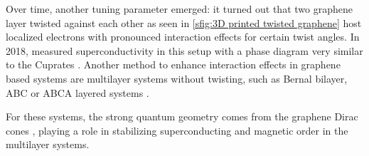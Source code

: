 \documentclass[../main.tex]{subfiles}
\begin{document}
Over time, another tuning parameter emerged: it turned out that two graphene layer twisted against each other as seen in \cref{sfig:3D printed twisted graphene} host localized electrons with pronounced interaction effects for certain twist angles.
In 2018, \citeauthor{caoUnconventionalSuperconductivityMagicangle2018} measured superconductivity in this setup with a phase diagram very similar to the Cuprates \cite{caoUnconventionalSuperconductivityMagicangle2018}.
Another method to enhance interaction effects in graphene based systems are multilayer systems without twisting, such as Bernal bilayer, ABC or ABCA layered systems \cite{pantaleonSuperconductivityCorrelatedPhases2023}.

For these systems, the strong quantum geometry comes from the graphene Dirac cones \cite{wehlingDiracMaterials2014}, playing a role in stabilizing superconducting \cite{peottaSuperfluidityTopologicallyNontrivial2015, liangBandGeometryBerry2017, tanakaSuperfluidStiffnessMagicangle2025, tianEvidenceDiracFlat2023, xieTopologyBoundedSuperfluidWeight2020, huGeometricConventionalContribution2019} and magnetic order \cite{abouelkomsanQuantumMetricInduced2023, liuOrbitalMagneticStates2021} in the multilayer systems.
\end{document}
